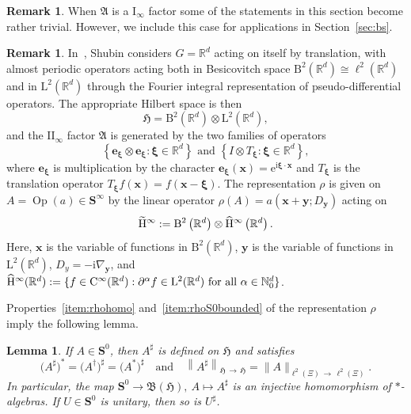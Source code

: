 \documentclass[10pt]{amsart}
\newtheorem{lemm}[theo]{Lemma}\newtheorem{prop}[theo]{Proposition}\newtheorem{coro}[theo]{Corollary}\newtheorem{conj}[theo]{Conjecture}
\theoremstyle{definition}\newtheorem{defi}[theo]{Definition}\newtheorem{rema}[theo]{Remark}\newtheorem{exam}[theo]{Example}\newtheorem{nota}[theo]{Notation}
\DeclareMathOperator{\Op}{Op}
\newcommand{\RL}{\mathrm{L}}
\newcommand{\rmI}{\mathrm{I}}
\newcommand{\rmi}{\mathrm{i}}
\newcommand{\rme}{\mathrm{e}}
\newcommand{\rmII}{\mathrm{II}}
\renewcommand{\mathsf}{\mathrm}
\newcommand{\sfH}{\mathsf{H}}
\newcommand{\sfB}{\mathsf{B}}
\newcommand{\sfL}{\mathsf{L}}
\newcommand{\sfC}{\mathsf{C}}
\newcommand{\R}{\mathbb R}
\newcommand{\N}{\mathbb N}
\newcommand{\bxi}{\boldsymbol \xi}
\newcommand{\BS}{\mathbf S}
\newcommand{\bx}{\mathbf x}
\newcommand{\be}{\mathbf e}
\newcommand{\by}{\mathbf y}
\newcommand{\FA}{\mathfrak A}
\newcommand{\FB}{\mathfrak B}
\newcommand{\FH}{\mathfrak H}
\newcommand{\set}[1]{\left\{ #1 \right\}}
\let\oldhat\hat
\renewcommand*{\hat}[1]{\mathchoice{\widehat{#1}}{\widehat{#1}}{\oldhat{#1}}{\oldhat{#1}}}
\begin{document}
\begin{rema}
When $\FA$ is a $\rmI_\infty$ factor some of the statements in this section become rather trivial. However, we include this case for applications in Section~\ref{sec:bs}.
\end{rema}
\begin{rema}\label{rem:Shubin}
In~\cite{Shubin1979a}, Shubin considers $G = \R^d$ acting on itself by translation, with almost periodic operators acting both in Besicovitch space $\sfB^2(\R^d)\cong \ell^2(\R^d)$ and in $\sfL^2(\R^d)$ through the Fourier integral representation of pseudo-differential operators. The appropriate Hilbert space is then
\begin{equation}\label{eq:hilbert}
\FH = \sfB^2\left(\R^d\right) \otimes \sfL^2\left(\R^d\right),
\end{equation}
and the $\rmII_\infty$ factor $\FA$ is generated by the two families of operators
\begin{equation}
\set{\be_{\bxi} \otimes \be_{\bxi}: \bxi \in \R^d} \text{ and } \set{I \otimes T_{\bxi}: \bxi \in \R^d},\label{eq:iiinffact}
\end{equation}
where $\be_{\bxi}$ is multiplication by the character $\be_{\bxi}(\bx)=\rme^{\rmi\bxi\cdot \bx}$ and $T_{\bxi}$ is the translation operator $T_{\bxi} f(\bx) = f(\bx - \bxi) $. The representation $\rho$ is given on $A=\Op(a)\in \BS^\infty$ by the linear operator $\rho(A)=a(\bx+\by;D_\by)$ acting on
\begin{equation}
\widetilde{\sfH}^\infty:=\sfB^2\left(\R^d\right) \otimes \hat{\sfH}^\infty\left(\R^d\right).
\end{equation}
Here, $\bx$ is the variable of functions in $\sfB^2(\R^d)$, $\by$ is the variable of functions in $\RL^2(\R^d)$, $D_y=-\rmi\nabla_\by$, and $\hat{\sfH}^\infty(\R^d):= \{f\in \sfC^\infty(\R^d): \partial^\alpha f\in\sfL^2(\R^d)\text{ for all }\alpha\in\N_0^d\}$.
\end{rema} 
Properties~\eqref{item:rhohomo} and~\eqref{item:rhoS0bounded} of the representation $\rho$ imply the following lemma.
\begin{lemm}\label{lem:sharpS0}
If $A\in\BS^0$, then $A^\sharp$ is defined on $\FH$ and satisfies 
\[
\big(A^\sharp\big)^*=\big(A^\dagger\big)^\sharp = \big(A^*\big)^\sharp\quad\text{and}\quad\left\|A^\sharp\right\|_{\FH\,\to\,\FH}=\|A\|_{\ell^2(\Xi)\,\to\,\ell^2(\Xi)}.
\]
In particular, the map $\BS^0\to\FB(\FH),\ A\mapsto A^\sharp$ is an injective homomorphism of $*$-algebras. If $U\in\BS^0$ is unitary, then so is $U^\sharp$.
\end{lemm}
\end{document}
